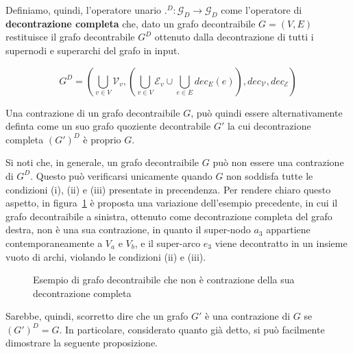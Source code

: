     Definiamo, quindi, l'operatore unario $.^D : \mathcal{G}_D \rightarrow \mathcal{G}_D$ come l'operatore di
    \textbf{decontrazione completa} che, dato un grafo decontraibile $G = (V, E)$ restituisce il grafo decontrabile
    $G^D$ ottenuto dalla decontrazione di tutti i supernodi e superarchi del grafo in input.

    \begin{equation*}
        G^D = (\bigcup_{v \in V} \mathcal{V}_v , (\bigcup_{v \in V} \mathcal{E}_v \cup \bigcup_{e \in E} dec_E(e)),
        dec_{\mathcal{V}}, dec_{\mathcal{E}})
    \end{equation*}

    Una contrazione di un grafo decontraibile $G$, pu\`o quindi essere alternativamente definta come un suo grafo
    quoziente decontrabile $G'$ la cui decontrazione completa $(G')^D$ \`e proprio $G$.
    \newline

    Si noti che, in generale, un grafo decontraibile $G$ pu\`o non essere una contrazione di $G^D$.
    Questo pu\`o verificarsi unicamente quando $G$ non soddisfa tutte le condizioni (i), (ii) e (iii) presentate in
    precendenza. \newline
    Per rendere chiaro questo aspetto, in figura~\ref{fig:non-contraction-example} \`e proposta una variazione
    dell'esempio precedente, in cui il grafo decontraibile a sinistra, ottenuto come decontrazione completa del grafo
    destra, non \`e una sua contrazione, in quanto il super-nodo $a_3$ appartiene contemporaneamente a $V_a$ e $V_b$,
    e il super-arco $e_3$ viene decontratto in un insieme vuoto di archi, violando le condizioni (ii) e (iii).

    \begin{figure}
        \centering
        
        \caption{Esempio di grafo decontraibile che non \`e contrazione della sua decontrazione completa}
        \label{fig:non-contraction-example}
    \end{figure}

    Sarebbe, quindi, scorretto dire che un grafo $G'$ \`e una contrazione di $G$ se $(G')^D = G$.
    In particolare, considerato quanto gi\`a detto, si pu\`o facilmente dimostrare la seguente proposizione.

